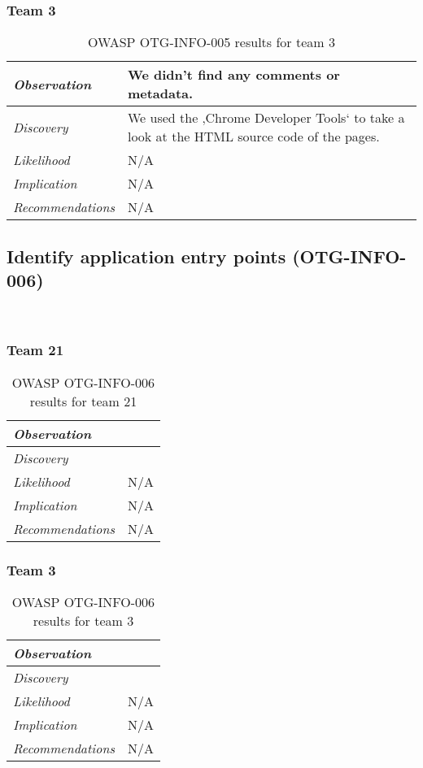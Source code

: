 \documentclass[headsepline,footsepline,footinclude=false,oneside,fontsize=11pt,paper=a4,listof=totoc,bibliography=totoc]{scrbook} %
\begin{document}
\subsubsection{Team 3}

\begin{table}[H]
\centering
 \begin{tabular}{l p{11cm}} 
 \textit{Observation} & We didn’t find any comments or metadata.\\ 
 \hline
 \textit{Discovery} & We used the ‚Chrome Developer Tools‘ to take a look at the HTML source code of the pages. \\
 \hline
 \textit{Likelihood} & N/A\\
 \hline
 \textit{Implication} & N/A\\
 \hline
 \textit{Recommendations} & N/A\\ 
\end{tabular}
\caption{OWASP OTG-INFO-005 results for team 3}
\label{table:scenario2}
\end{table}
\pagebreak 

\subsection{Identify application entry points (OTG-INFO-006)}\

\subsubsection{Team 21}

\begin{table}[H]
\centering
 \begin{tabular}{l p{11cm}} 
 \textit{Observation} & \\ 
 \hline
 \textit{Discovery} &  \\
 \hline
 \textit{Likelihood} & N/A\\
 \hline
 \textit{Implication} & N/A\\
 \hline
 \textit{Recommendations} & N/A\\ 
\end{tabular}
\caption{OWASP OTG-INFO-006 results for team 21}
\label{table:scenario2}
\end{table}

\subsubsection{Team 3}

\begin{table}[H]
\centering
 \begin{tabular}{l p{11cm}} 
 \textit{Observation} & \\ 
 \hline
 \textit{Discovery} &  \\
 \hline
 \textit{Likelihood} & N/A\\
 \hline
 \textit{Implication} & N/A\\
 \hline
 \textit{Recommendations} & N/A\\ 
\end{tabular}
\caption{OWASP OTG-INFO-006 results for team 3}
\label{table:scenario2}
\end{table}
\end{document}
